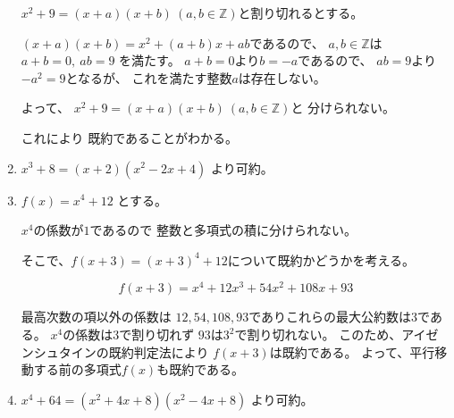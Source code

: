 \documentclass[12pt,b5paper]{ltjsarticle}
\begin{document}
\begin{enumerate}
      $x^2 + 9=(x+a)(x+b) \ (a,b\in\mathbb{Z})$と割り切れるとする。

      $(x+a)(x+b)=x^2+(a+b)x+ab$であるので、
      $a,b\in\mathbb{Z}$は
      $a+b=0, \ ab=9$
      を満たす。
      $a+b=0$より$b=-a$であるので、
      $ab=9$より$-a^2=9$となるが、
      これを満たす整数$a$は存在しない。

      よって、
      $x^2 + 9=(x+a)(x+b) \ (a,b\in\mathbb{Z})$と
      分けられない。

      これにより
      既約であることがわかる。

 \item
      $x^3 + 8 = (x+2)(x^2-2x+4)$
      より可約。


 \item
      $f(x)=x^4 + 12$
      とする。

      $x^4$の係数が$1$であるので
      整数と多項式の積に分けられない。

      そこで、$f(x+3)=(x+3)^4 +12$について既約かどうかを考える。

      \begin{equation}
       f(x+3) = x^4 + 12x^3 + 54x^2 + 108x + 93
      \end{equation}

      最高次数の項以外の係数は
      $12,54,108,93$でありこれらの最大公約数は$3$である。
      $x^4$の係数は$3$で割り切れず
      $93$は$3^2$で割り切れない。
      このため、アイゼンシュタインの既約判定法により
      $f(x+3)$は既約である。
      よって、平行移動する前の多項式$f(x)$も既約である。

 \item
      $x^4 + 64 = (x^2+4x+8)(x^2-4x+8)$
      より可約。

\end{enumerate}

\hrulefill
\end{document}
